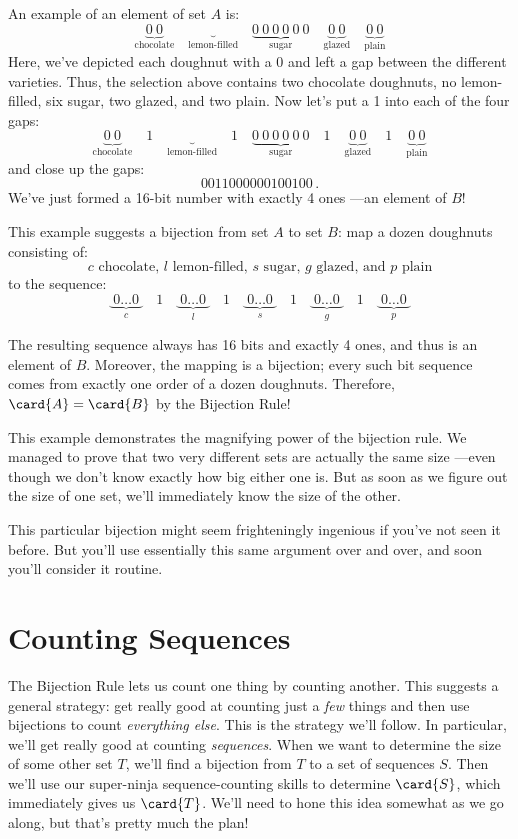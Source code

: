 An example of an element of set $A$ is:
%
\[
\underbrace{0\ 0}_{\text{chocolate}} \quad
\underbrace{}_{\text{lemon-filled}} \quad
\underbrace{0\ 0\ 0\ 0\ 0\ 0}_{\text{sugar}} \quad
\underbrace{0\ 0}_{\text{glazed}} \quad
\underbrace{0\ 0}_{\text{plain}}
\]
Here, we've depicted each doughnut with a $0$ and left a gap between
the different varieties.  Thus, the selection above contains two
chocolate doughnuts, no lemon-filled, six sugar, two glazed, and two
plain.  Now let's put a 1 into each of the four gaps:
\[
\underbrace{0\ 0}_{\text{chocolate}} \quad 1 \quad
\underbrace{}_{\text{lemon-filled}} \quad 1 \quad
\underbrace{0\ 0\ 0\ 0\ 0\ 0}_{\text{sugar}} \quad 1 \quad
\underbrace{0\ 0}_{\text{glazed}} \quad 1 \quad
\underbrace{0\ 0}_{\text{plain}}
\]
and close up the gaps:
\[
0011000000100100 \,.
\]
We've just formed a 16-bit number with exactly 4 ones ---an element of
$B$!

This example suggests a bijection from set $A$ to set $B$: map a dozen
doughnuts consisting of:
%
\[
\text{$c$ chocolate, $l$ lemon-filled, $s$ sugar, $g$ glazed, and $p$ plain}
\]
%
to the sequence:
%
\[
\underbrace{\ 0 \ldots 0\ }_{\text{$c$}} \quad 1 \quad
\underbrace{\ 0 \ldots 0\ }_{\text{$l$}} \quad 1 \quad
\underbrace{\ 0 \ldots 0\ }_{\text{$s$}} \quad 1 \quad
\underbrace{\ 0 \ldots 0\ }_{\text{$g$}} \quad 1 \quad
\underbrace{\ 0 \ldots 0\ }_{\text{$p$}}
\]

The resulting sequence always has 16 bits and exactly 4 ones, and thus
is an element of $B$.  Moreover, the mapping is a bijection; every
such bit sequence comes from exactly one order of a dozen doughnuts.
Therefore, $\card{A} = \card{B}$ by the Bijection Rule!

This example demonstrates the magnifying power of the bijection rule.
We managed to prove that two very different sets are actually the same
size ---even though we don't know exactly how big either one is.  But
as soon as we figure out the size of one set, we'll immediately know
the size of the other.

This particular bijection might seem frighteningly ingenious if you've
not seen it before.  But you'll use essentially this same argument
over and over, and soon you'll consider it routine.

\section{Counting Sequences}\label{sec:counting_sequences}

The Bijection Rule lets us count one thing by counting another.  This
suggests a general strategy: get really good at counting just a
\emph{few} things and then use bijections to count
\emph{everything else}.  This is the strategy we'll follow.  In
particular, we'll get really good at counting \emph{sequences}.  When
we want to determine the size of some other set $T$, we'll find a
bijection from $T$ to a set of sequences $S$.  Then we'll use our
super-ninja sequence-counting skills to determine $\card{S}$, which
immediately gives us $\card{T}$.  We'll need to hone this idea
somewhat as we go along, but that's pretty much the plan!

